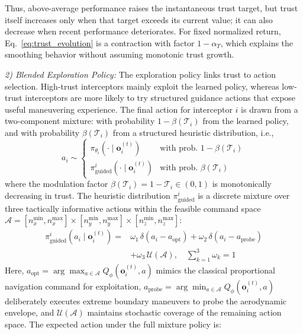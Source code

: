 \documentclass[lettersize,journal]{IEEEtran}
\providecommand{\DIFadd}[1]{{\protect\color{blue} #1}} %
\providecommand{\DIFdel}[1]{} %
\providecommand{\DIFaddbegin}{} %
\providecommand{\DIFaddend}{} %
\providecommand{\DIFdelbegin}{} %
\providecommand{\DIFdelend}{} %
\begin{document}
\DIFadd{Thus, above-average performance raises the instantaneous trust target, but
trust itself increases only when that target exceeds its current value; it can
also decrease when recent performance deteriorates. For fixed normalized
return, Eq.~}\eqref{eq:trust_evolution} \DIFadd{is a contraction with factor
\(1-\alpha_T\), which explains the smoothing behavior without assuming
monotonic trust growth}\DIFaddend .

\emph{2) Blended Exploration Policy:} The exploration policy links trust to action selection. High-trust interceptors mainly exploit the learned policy, whereas low-trust interceptors are more likely to try structured guidance actions that expose useful maneuvering experience. The final action for interceptor $i$ is drawn from a two-component mixture: with probability $1-\beta(\mathcal{T}_i)$ from the learned policy, and with probability $\beta(\mathcal{T}_i)$ from a structured heuristic distribution, i.e.,
\begin{equation}
\label{eq:exploration_policy}
a_i \sim \begin{cases} \pi_{\theta_i}(\cdot \mid \mathbf{o}_i^{(t)}) & \text{with prob. } 1 - \beta(\mathcal{T}_i) \\ \pi_{\mathrm{guided}}^{i}(\cdot \mid \mathbf{o}_i^{(t)}) & \text{with prob. } \beta(\mathcal{T}_i) \end{cases}
\end{equation}
where the modulation factor $\beta(\mathcal{T}_i) = 1 - \mathcal{T}_i \in (0,1)$ is monotonically decreasing in trust. The heuristic distribution $\pi_{\mathrm{guided}}^{i}$ is a discrete mixture over three tactically informative actions within the feasible command space
\DIFdelbegin \DIFdel{$\mathcal{A} = [n_{x}^{\min}, n_{x}^{\max}] \times [n_{y}^{\min}, n_{y}^{\max}]$}\DIFdelend \DIFaddbegin \DIFadd{\(\mathcal{A}=[n_x^{\min},n_x^{\max}]\times
[n_y^{\min},n_y^{\max}]\times[n_z^{\min},n_z^{\max}]\)}\DIFaddend :
\begin{equation}
\label{eq:guided}
\begin{split}
\pi_{\mathrm{guided}}^{i}(a_i \mid \mathbf{o}_i^{(t)}) =& \omega_1\,\delta(a_i - a_{\mathrm{opt}}) + \omega_2\,\delta(a_i - a_{\mathrm{probe}}) \\
&+ \omega_3\,\mathcal{U}(\mathcal{A}), \quad \sum_{k=1}^3\omega_k=1
\end{split}
\end{equation}
Here, $a_{\mathrm{opt}} = \arg\max_{a \in \mathcal{A}} Q_\phi(\mathbf{o}_i^{(t)}, a)$ mimics the classical proportional navigation command for exploitation, $a_{\mathrm{probe}} = \arg\min_{a \in \mathcal{A}} Q_\phi(\mathbf{o}_i^{(t)}, a)$ deliberately executes extreme boundary maneuvers to probe the aerodynamic envelope, and $\mathcal{U}(\mathcal{A})$ maintains stochastic coverage of the remaining action space. The expected action under the full mixture policy is:
\end{document}
